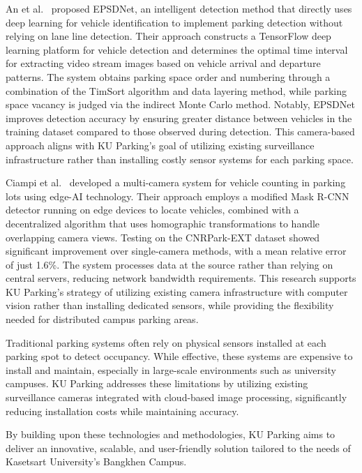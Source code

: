 An et al.~ \cite{an2022epsdnet} proposed EPSDNet, an intelligent detection method that directly uses deep learning 
for vehicle identification to implement parking detection without relying on lane line detection. Their approach constructs a TensorFlow deep learning platform for vehicle detection and determines the optimal time interval for  extracting video stream images based on vehicle arrival and departure patterns.  The system obtains parking space order and numbering through a combination of the TimSort algorithm and data layering method,  while parking space vacancy is judged via the indirect Monte Carlo method. Notably, EPSDNet improves detection accuracy by ensuring greater distance between vehicles in the training dataset compared to those observed during detection. This camera-based approach aligns with KU Parking's goal of utilizing existing surveillance infrastructure rather than installing costly sensor systems for each parking space.

Ciampi et al.~\cite{ciampi2022multicamera} developed a multi-camera system for vehicle counting in parking lots using edge-AI technology. 
Their approach employs a modified Mask R-CNN detector running on edge devices to locate vehicles, combined with a decentralized algorithm that uses homographic transformations to handle overlapping camera views. 
Testing on the CNRPark-EXT dataset showed significant improvement over single-camera methods, with a mean relative error of just 1.6\%. 
The system processes data at the source rather than relying on central servers, reducing network bandwidth requirements. 
This research supports KU Parking's strategy of utilizing existing camera infrastructure with computer vision rather than installing dedicated sensors, 
while providing the flexibility needed for distributed campus parking areas.

Traditional parking systems often rely on physical sensors installed at each parking spot to detect occupancy. 
While effective, these systems are expensive to install and maintain, especially in large-scale environments such as university campuses. 
KU Parking addresses these limitations by utilizing existing surveillance cameras integrated with cloud-based image processing, 
significantly reducing installation costs while maintaining accuracy.

By building upon these technologies and methodologies, KU Parking aims to deliver an innovative, scalable, and user-friendly solution tailored to the needs of Kasetsart University's Bangkhen Campus.